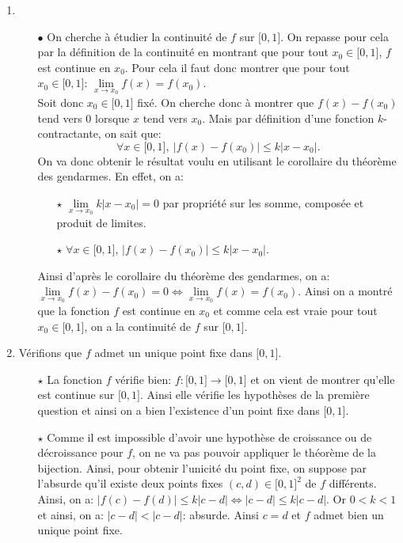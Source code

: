 \documentclass[a4paper, 11pt,reqno]{article}
\begin{document}
\begin{correction}  \;
\begin{enumerate}
\item 
\begin{itemize}
\item[$\bullet$] On cherche \`{a} \'etudier la continuit\'e de $f$ sur $\lbrack 0,1\rbrack$. On repasse pour cela par la d\'efinition de la continuit\'e en montrant que pour tout $x_0\in\lbrack 0,1\rbrack$, $f$ est continue en $x_0$. Pour cela il faut donc montrer que pour tout $x_0\in\lbrack 0,1\rbrack$: $\lim\limits_{x\to x_0} f(x)=f(x_0)$.\\
\noindent Soit donc $x_0\in\lbrack 0,1\rbrack$ fix\'e. On cherche donc \`{a} montrer que $f(x)-f(x_0)$ tend vers 0 lorsque $x$ tend vers $x_0$. Mais par d\'efinition d'une fonction $k$-contractante, on sait que:
$$\forall x\in\lbrack 0,1\rbrack,\ |f(x)-f(x_0)|\leq k|x-x_0|.$$
On va donc obtenir le r\'esultat voulu en utilisant le corollaire du th\'eor\`{e}me des gendarmes. En effet, on a:
\begin{itemize}
\item[$\star$] $\lim\limits_{x\to x_0} k |x-x_0|=0$ par propri\'et\'e sur les somme, compos\'ee et produit de limites.
\item[$\star$] $\forall x\in\lbrack 0,1\rbrack$, $|f(x)-f(x_0)|\leq k |x-x_0|$.
\end{itemize}
Ainsi d'apr\`{e}s le corollaire du th\'eor\`{e}me des gendarmes, on a: $\lim\limits_{x\to x_0} f(x)-f(x_0)=0\Leftrightarrow \lim\limits_{x\to x_0} f(x)=f(x_0)$. Ainsi on a montr\'e que la fonction $f$ est continue en $x_0$ et comme cela est vraie pour tout $x_0\in\lbrack 0,1\rbrack$, on a la continuit\'e de $f$ sur $\lbrack 0,1\rbrack$. 

\end{itemize}
\item V\'erifions que $f$ admet un unique point fixe dans $\lbrack 0,1\rbrack$.
\begin{itemize}
\item[$\star$] La fonction $f$ v\'erifie bien: $f: \lbrack 0,1\rbrack\rightarrow \lbrack 0,1\rbrack$ et on vient de montrer qu'elle est continue sur $\lbrack 0,1\rbrack$. Ainsi elle v\'erifie les hypoth\`{e}ses de la premi\`{e}re question et ainsi on a bien l'existence d'un point fixe dans $\lbrack 0,1\rbrack$.
\item[$\star$] Comme il est impossible d'avoir une hypoth\`{e}se de croissance ou de d\'ecroissance pour $f$, on ne va pas pouvoir appliquer le th\'eor\`{e}me de la bijection. Ainsi, pour obtenir l'unicit\'e du point fixe, on suppose par l'absurde qu'il existe deux points fixes $(c,d)\in\lbrack 0,1\rbrack^2$ de $f$ diff\'erents. Ainsi, on a: 
$|f(c)-f(d)|\leq k|c-d|\Leftrightarrow |c-d|\leq k|c-d|$. Or $0<k<1$ et ainsi, on a: $|c-d|<|c-d|$: absurde. Ainsi $c=d$ et $f$ admet bien un unique point fixe.
\end{itemize}


\end{enumerate}
\end{correction}
\end{document}
